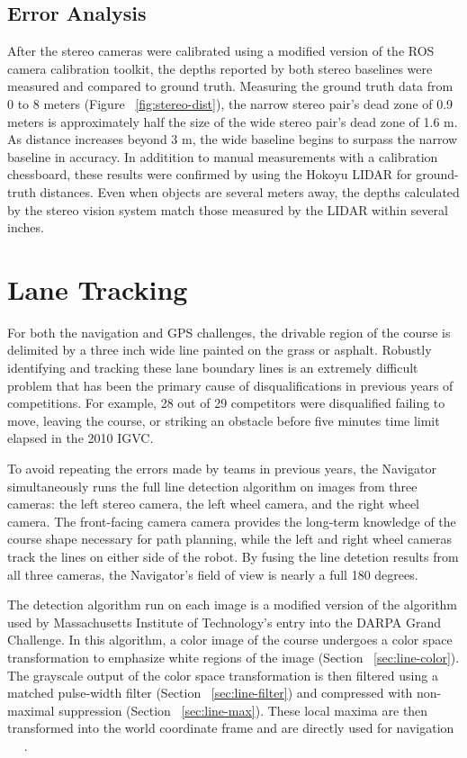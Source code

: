 \documentclass[twocolumn,11pt]{article}
\begin{document}
\subsection{Error Analysis}
\label{sec:stereo-error}
After the stereo cameras were calibrated using a modified version of the ROS
camera calibration toolkit, the depths reported by both stereo baselines were
measured and compared to ground truth. Measuring the ground truth data from 0
to 8 meters (Figure ~\ref{fig:stereo-dist}), the narrow stereo pair's dead
zone of 0.9 meters is approximately half the size of the wide stereo pair's
dead zone of 1.6 m. As distance increases beyond 3 m, the wide baseline begins
to surpass the narrow baseline in accuracy. In additition to manual measurements
with a calibration chessboard, these results were confirmed by using the Hokoyu
LIDAR for ground-truth distances. Even when objects are several meters away,
the depths calculated by the stereo vision system match those measured by
the LIDAR within several inches.

\section{Lane Tracking}
\label{sec:line}
For both the navigation and GPS challenges, the drivable region of the course
is delimited by a three inch wide line painted on the grass or asphalt.
Robustly identifying and tracking these lane boundary lines is an extremely
difficult problem that has been the primary cause of disqualifications in
previous years of competitions. For example, 28 out of 29 competitors were
disqualified failing to move, leaving the course, or striking an obstacle
before five minutes time limit elapsed in the 2010 IGVC.

To avoid repeating the errors made by teams in previous years, the Navigator
simultaneously runs the full line detection algorithm on images from three
cameras: the left stereo camera, the left wheel camera, and the right
wheel camera. The front-facing camera camera provides the long-term knowledge
of the course shape necessary for path planning, while the left and right
wheel cameras track the lines on either side of the robot. By fusing the
line detetion results from all three cameras, the Navigator's field of view
is nearly a full 180 degrees.

The detection algorithm run on each image is a modified version of the
algorithm used by Massachusetts Institute of Technology's entry into the DARPA
Grand Challenge.  In this algorithm, a color image of the course undergoes a
color space transformation to emphasize white regions of the image (Section
~\ref{sec:line-color}). The grayscale output of the color space transformation
is then filtered using a matched pulse-width filter (Section
~\ref{sec:line-filter}) and compressed with non-maximal suppression (Section
~\ref{sec:line-max}). These local maxima are then transformed into the world
coordinate frame and are directly used for navigation ~\cite{huang_thesis}
~\cite{huang_paper}.
\end{document}
